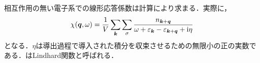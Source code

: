 \documentclass{ltjarticle}
\begin{document}
相互作用の無い電子系での線形応答係数は計算により求まる．実際に，
\begin{align}
  \chi(\bm{q},\omega) = \frac{1}{V} \sum_{\bm{k}} \sum_{\sigma} \frac{n_{\bm{k} + \bm{q}}}{\omega + \varepsilon_{\bm{k}} - \varepsilon_{\bm{k} + \bm{q}} + \mathrm{i} \eta} \label{eq:lindhard}
\end{align}
となる．$\eta$は導出過程で導入された積分を収束させるための無限小の正の実数である．はLindhard関数と呼ばれる．
\end{document}
